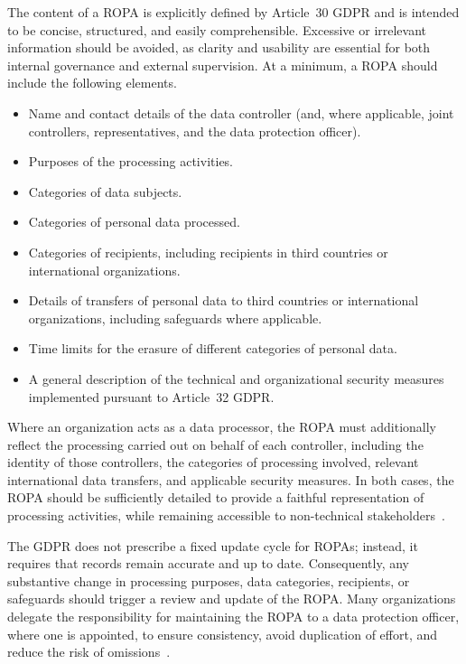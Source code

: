 The content of a ROPA is explicitly defined by Article~30 GDPR and is intended to be concise, structured, and easily comprehensible. Excessive or irrelevant information should be avoided, as clarity and usability are essential for both internal governance and external supervision. At a minimum, a ROPA should include the following elements.

\begin{itemize}
  \item Name and contact details of the data controller (and, where applicable, joint controllers, representatives, and the data protection officer).
  \item Purposes of the processing activities.
  \item Categories of data subjects.
  \item Categories of personal data processed.
  \item Categories of recipients, including recipients in third countries or international organizations.
  \item Details of transfers of personal data to third countries or international organizations, including safeguards where applicable.
  \item Time limits for the erasure of different categories of personal data.
  \item A general description of the technical and organizational security measures implemented pursuant to Article~32 GDPR.
\end{itemize}

Where an organization acts as a data processor, the ROPA must additionally reflect the processing carried out on behalf of each controller, including the identity of those controllers, the categories of processing involved, relevant international data transfers, and applicable security measures. In both cases, the ROPA should be sufficiently detailed to provide a faithful representation of processing activities, while remaining accessible to non-technical stakeholders~\cite{gdpr-info-art30}.

The GDPR does not prescribe a fixed update cycle for ROPAs; instead, it requires that records remain accurate and up to date. Consequently, any substantive change in processing purposes, data categories, recipients, or safeguards should trigger a review and update of the ROPA. Many organizations delegate the responsibility for maintaining the ROPA to a data protection officer, where one is appointed, to ensure consistency, avoid duplication of effort, and reduce the risk of omissions~\cite{gdpr-info-art30, osano-ropa}.

